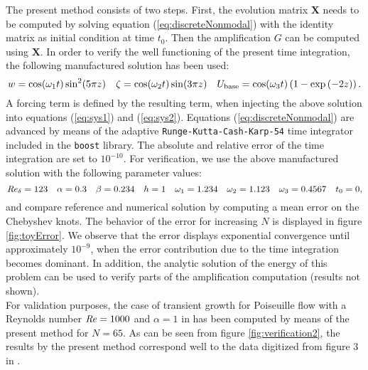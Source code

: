 \documentclass{jfm}
\newcommand\be{\begin{equation}}
\newcommand\ee{\end{equation}}
\newcommand\base{{\rm base}}
\newcommand\Rey{\mbox{\textit{Re}}}  %
\begin{document}
\begin{appendix}
The present method consists of two steps. First, the evolution matrix $ \mathbf{X} $
needs to be computed by solving equation (\ref{eq:discreteNonmodal}) with the
identity matrix as initial condition at time $ t_0 $. Then the amplification $ G $ can
be computed using $ \mathbf{X} $. In order to verify the well functioning of the
present time integration, the following manufactured solution has been used:
\be
w = \cos (\omega_1 t) \sin^2 ( 5 \pi z) \quad
\zeta = \cos (\omega_2 t) \sin ( 3 \pi z) \quad
U_\base = \cos (\omega_3 t) \left( 1 - \exp \left( -2z \right) \right). \label{eq:toyProblem}
\ee
A forcing term is defined by the resulting term, when injecting the above solution into equations (\ref{eq:sys1}) and (\ref{eq:sys2}). Equations (\ref{eq:discreteNonmodal}) are advanced by means
of the adaptive {\tt Runge-Kutta-Cash-Karp-54} time integrator
included in the {\tt boost} library. The absolute and relative error of the time
integration are set to $ 10^{-10} $. For verification, we use the above manufactured solution
with the following parameter values:
\be
\Rey_\delta = 123 \quad \alpha = 0.3 \quad \beta = 0.234 \quad h = 1 \quad \omega_1 = 1.234 \quad \omega_2 = 1.123 \quad \omega_3 = 0.4567 \quad t_0 = 0,
\ee
and compare reference and numerical solution by computing a mean error on the Chebyshev knots.
The behavior of the error for increasing $ N $ is displayed in figure \ref{fig:toyError}. We observe
that the error displays exponential convergence until approximately $ 10^{-9} $, when the
error contribution due to the time integration becomes dominant. In addition, the analytic
solution of the energy of this problem can be used to verify parts of the amplification
computation (results not shown). \\

For validation purposes, the case of
transient growth for
Poiseuille flow with a Reynolds number $ \Rey = 1000 $ and $ \alpha = 1 $
in \cite{Schmid2007} has been computed by means of the present method for $ N = 65 $.
As can be seen from figure \ref{fig:verification2}, the
results by the present method correspond well to
the data digitized from figure 3 in \cite{Schmid2007}. \\


\end{appendix}
\end{document}
